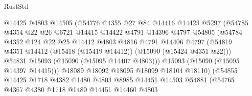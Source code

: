 \begin{lexlean}{RustStd}
\begin{coremodule}
                            @14425
                            @4803
                            @14505
                            (@54776
                              @4355
                              @27
                              @84
                              @14416
                              @14423
                              @5297
                              (@54785
                                @4354
                                @22
                                @26
                                @6721
                                @14415
                                @14422
                                @4791
                                @14396
                                @4797
                                @54805
                                (@54784
                                  @4352
                                  @124
                                  @22
                                  @25
                                  @14412
                                  @4803
                                  @4816
                                  @4791
                                  @14406
                                  @4797
                                  (@54819
                                    @4351
                                    @14412
                                    (@15418 (@15419 @14412))
                                    (@15090 (@15424 @4351 @22)))
                                  @54831
                                  @15093
                                  (@15090 (@15095 @14407 @4803)))
                                @15093
                                (@15090 (@15095 @14397 @14415)))
                              @18089
                              @18092
                              @18095
                              @18099
                              @18104
                              @18110)
                            (@54855
                              @14425
                              @1718
                              @4382
                              @1480
                              @4803
                              @8985
                              @14451
                              @14503
                              @54881
                              (@54765
                                @4367
                                @4380
                                @1718
                                @1480
                                @14451
                                @14460
                                @4803

\end{coremodule}
\end{lexlean}
